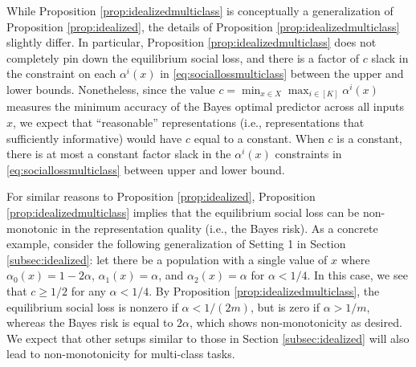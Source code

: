\documentclass[letterpaper,11pt]{article}
\theoremstyle{plain}
\DeclareMathOperator*{\argmax}{arg\,max}
\DeclareMathOperator*{\Prob}{\mathbb{P}}
\begin{document}
While Proposition \ref{prop:idealizedmulticlass} is conceptually a generalization of Proposition \ref{prop:idealized}, the details of Proposition \ref{prop:idealizedmulticlass} slightly differ. In particular, Proposition \ref{prop:idealizedmulticlass} does not completely pin down the equilibrium social loss, and there is a factor of $c$ slack in the constraint on each $\alpha^i(x)$ in \eqref{eq:sociallossmulticlass} between the upper and lower bounds. Nonetheless, since the value $c = \min_{x \in X} \max_{i \in [K]} \alpha^i(x)$ measures the minimum accuracy of the Bayes optimal predictor across all inputs $x$, we expect that ``reasonable'' representations (i.e., representations that sufficiently informative) would have $c$ equal to a constant. When $c$ is a constant, there is at most a constant factor slack in the $\alpha^i(x)$ constraints in \eqref{eq:sociallossmulticlass} between upper and lower bound. 

For similar reasons to Proposition \ref{prop:idealized}, Proposition \ref{prop:idealizedmulticlass}  implies that the equilibrium social loss can be non-monotonic in the representation quality (i.e., the Bayes risk). As a concrete example, consider the following generalization of Setting 1 in Section \ref{subsec:idealized}: let there be a population with a single value of $x$ where $\alpha_0(x) = 1 - 2\alpha$, $\alpha_1(x) = \alpha$, and $\alpha_2(x) = \alpha$ for $\alpha < 1/4$. In this case, we see that $c \ge 1/2$ for any $\alpha < 1/4$. By Proposition \ref{prop:idealizedmulticlass}, the equilibrium social loss is nonzero if $\alpha < 1/(2m)$, but is zero if $\alpha > 1/m$, whereas the Bayes risk is equal to $2 \alpha$, which shows non-monotonicity as desired. We expect that other setups similar to those in Section \ref{subsec:idealized} will also lead to non-monotonicity for multi-class tasks. 

\end{document}
